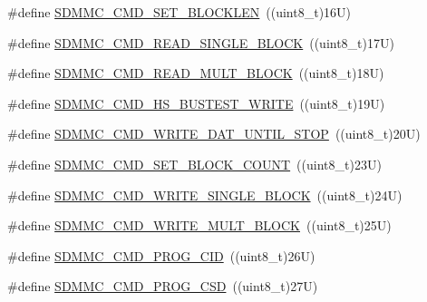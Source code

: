 \begin{DoxyCompactItemize}
\#define \mbox{\hyperlink{group___s_d_m_m_c___l_l___exported___constants_gaa4423e346793a64eb56943dbd6a4b713}{S\+D\+M\+M\+C\+\_\+\+C\+M\+D\+\_\+\+S\+E\+T\+\_\+\+B\+L\+O\+C\+K\+L\+EN}}~((uint8\+\_\+t)16\+U)
\item 
\#define \mbox{\hyperlink{group___s_d_m_m_c___l_l___exported___constants_ga5ad8065d25f60abaeaaeb0713e7cdf99}{S\+D\+M\+M\+C\+\_\+\+C\+M\+D\+\_\+\+R\+E\+A\+D\+\_\+\+S\+I\+N\+G\+L\+E\+\_\+\+B\+L\+O\+CK}}~((uint8\+\_\+t)17\+U)
\item 
\#define \mbox{\hyperlink{group___s_d_m_m_c___l_l___exported___constants_ga0eec4f155a53a151115020ffe67379fb}{S\+D\+M\+M\+C\+\_\+\+C\+M\+D\+\_\+\+R\+E\+A\+D\+\_\+\+M\+U\+L\+T\+\_\+\+B\+L\+O\+CK}}~((uint8\+\_\+t)18\+U)
\item 
\#define \mbox{\hyperlink{group___s_d_m_m_c___l_l___exported___constants_gae6a00b05de201e57c883940ff2829e39}{S\+D\+M\+M\+C\+\_\+\+C\+M\+D\+\_\+\+H\+S\+\_\+\+B\+U\+S\+T\+E\+S\+T\+\_\+\+W\+R\+I\+TE}}~((uint8\+\_\+t)19\+U)
\item 
\#define \mbox{\hyperlink{group___s_d_m_m_c___l_l___exported___constants_gaed8d4c536526d725dba3002ec134ca9f}{S\+D\+M\+M\+C\+\_\+\+C\+M\+D\+\_\+\+W\+R\+I\+T\+E\+\_\+\+D\+A\+T\+\_\+\+U\+N\+T\+I\+L\+\_\+\+S\+T\+OP}}~((uint8\+\_\+t)20\+U)
\item 
\#define \mbox{\hyperlink{group___s_d_m_m_c___l_l___exported___constants_ga14a69cd3bde7225b646f1dcb2ebfda03}{S\+D\+M\+M\+C\+\_\+\+C\+M\+D\+\_\+\+S\+E\+T\+\_\+\+B\+L\+O\+C\+K\+\_\+\+C\+O\+U\+NT}}~((uint8\+\_\+t)23\+U)
\item 
\#define \mbox{\hyperlink{group___s_d_m_m_c___l_l___exported___constants_ga5f0d773316e556410a808bcc0444c79a}{S\+D\+M\+M\+C\+\_\+\+C\+M\+D\+\_\+\+W\+R\+I\+T\+E\+\_\+\+S\+I\+N\+G\+L\+E\+\_\+\+B\+L\+O\+CK}}~((uint8\+\_\+t)24\+U)
\item 
\#define \mbox{\hyperlink{group___s_d_m_m_c___l_l___exported___constants_ga34c0b4b60cbf92725e81fef6d1c7443b}{S\+D\+M\+M\+C\+\_\+\+C\+M\+D\+\_\+\+W\+R\+I\+T\+E\+\_\+\+M\+U\+L\+T\+\_\+\+B\+L\+O\+CK}}~((uint8\+\_\+t)25\+U)
\item 
\#define \mbox{\hyperlink{group___s_d_m_m_c___l_l___exported___constants_gab9cd3dc398c03f289d0ca4c6c0db4892}{S\+D\+M\+M\+C\+\_\+\+C\+M\+D\+\_\+\+P\+R\+O\+G\+\_\+\+C\+ID}}~((uint8\+\_\+t)26\+U)
\item 
\#define \mbox{\hyperlink{group___s_d_m_m_c___l_l___exported___constants_gaabbed26c00688f1d52cd72cbd978949c}{S\+D\+M\+M\+C\+\_\+\+C\+M\+D\+\_\+\+P\+R\+O\+G\+\_\+\+C\+SD}}~((uint8\+\_\+t)27\+U)
\item 

\end{DoxyCompactItemize}

